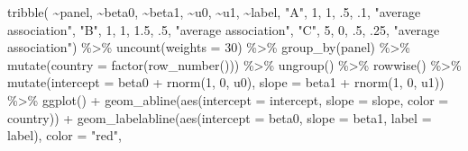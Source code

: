 \documentclass[
  letterpaper,
  DIV=11,
  numbers=noendperiod]{scrreprt}
\newenvironment{Shaded}{\begin{snugshade}}{\end{snugshade}}
\newcommand{\AttributeTok}[1]{\textcolor[rgb]{0.40,0.45,0.13}{#1}}
\newcommand{\DecValTok}[1]{\textcolor[rgb]{0.68,0.00,0.00}{#1}}
\newcommand{\FloatTok}[1]{\textcolor[rgb]{0.68,0.00,0.00}{#1}}
\newcommand{\FunctionTok}[1]{\textcolor[rgb]{0.28,0.35,0.67}{#1}}
\newcommand{\NormalTok}[1]{\textcolor[rgb]{0.00,0.23,0.31}{#1}}
\newcommand{\SpecialCharTok}[1]{\textcolor[rgb]{0.37,0.37,0.37}{#1}}
\newcommand{\StringTok}[1]{\textcolor[rgb]{0.13,0.47,0.30}{#1}}
\begin{document}
\begin{Shaded}
\begin{Highlighting}[]
\FunctionTok{tribble}\NormalTok{(}
  \SpecialCharTok{\textasciitilde{}}\NormalTok{panel, }\SpecialCharTok{\textasciitilde{}}\NormalTok{beta0, }\SpecialCharTok{\textasciitilde{}}\NormalTok{beta1, }\SpecialCharTok{\textasciitilde{}}\NormalTok{u0, }\SpecialCharTok{\textasciitilde{}}\NormalTok{u1, }\SpecialCharTok{\textasciitilde{}}\NormalTok{label,}
  \StringTok{"A"}\NormalTok{, }\DecValTok{1}\NormalTok{, }\DecValTok{1}\NormalTok{, .}\DecValTok{5}\NormalTok{, .}\DecValTok{1}\NormalTok{, }\StringTok{"average association"}\NormalTok{,}
  \StringTok{"B"}\NormalTok{, }\DecValTok{1}\NormalTok{, }\DecValTok{1}\NormalTok{, }\FloatTok{1.5}\NormalTok{, .}\DecValTok{5}\NormalTok{, }\StringTok{"average association"}\NormalTok{,}
  \StringTok{"C"}\NormalTok{, }\DecValTok{5}\NormalTok{, }\DecValTok{0}\NormalTok{, .}\DecValTok{5}\NormalTok{, .}\DecValTok{25}\NormalTok{, }\StringTok{"average association"}\NormalTok{) }\SpecialCharTok{\%\textgreater{}\%} 
  \FunctionTok{uncount}\NormalTok{(}\AttributeTok{weights =} \DecValTok{30}\NormalTok{) }\SpecialCharTok{\%\textgreater{}\%}
  \FunctionTok{group\_by}\NormalTok{(panel) }\SpecialCharTok{\%\textgreater{}\%}
  \FunctionTok{mutate}\NormalTok{(}\AttributeTok{country =} \FunctionTok{factor}\NormalTok{(}\FunctionTok{row\_number}\NormalTok{())) }\SpecialCharTok{\%\textgreater{}\%}
  \FunctionTok{ungroup}\NormalTok{() }\SpecialCharTok{\%\textgreater{}\%}
  \FunctionTok{rowwise}\NormalTok{() }\SpecialCharTok{\%\textgreater{}\%}
  \FunctionTok{mutate}\NormalTok{(}\AttributeTok{intercept =}\NormalTok{ beta0 }\SpecialCharTok{+} \FunctionTok{rnorm}\NormalTok{(}\DecValTok{1}\NormalTok{, }\DecValTok{0}\NormalTok{, u0),}
         \AttributeTok{slope =}\NormalTok{ beta1 }\SpecialCharTok{+} \FunctionTok{rnorm}\NormalTok{(}\DecValTok{1}\NormalTok{, }\DecValTok{0}\NormalTok{, u1)) }\SpecialCharTok{\%\textgreater{}\%}
  \FunctionTok{ggplot}\NormalTok{() }\SpecialCharTok{+}
  \FunctionTok{geom\_abline}\NormalTok{(}\FunctionTok{aes}\NormalTok{(}\AttributeTok{intercept =}\NormalTok{ intercept, }
                  \AttributeTok{slope =}\NormalTok{ slope,}
                  \AttributeTok{color =}\NormalTok{ country)) }\SpecialCharTok{+}
  \FunctionTok{geom\_labelabline}\NormalTok{(}\FunctionTok{aes}\NormalTok{(}\AttributeTok{intercept =}\NormalTok{ beta0,}
                       \AttributeTok{slope =}\NormalTok{ beta1,}
                       \AttributeTok{label =}\NormalTok{ label),}
                   \AttributeTok{color =} \StringTok{"red"}\NormalTok{,}

\end{Highlighting}
\end{Shaded}
\end{document}
